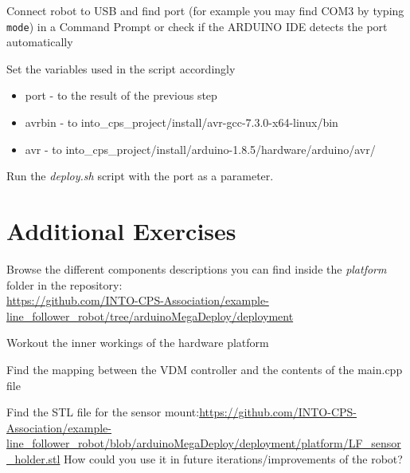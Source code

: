 \documentclass[11pt,a4paper]{../tutorial}
\begin{document}
\begin{instructions} 
\item Connect robot to USB and find port (for example you may find COM3 by typing \verb'mode') in a Command Prompt or check if the ARDUINO IDE detects the port automatically 

\item Set the variables used in the script accordingly
	\begin{itemize}
		\item port - to the result of the previous step
		\item avrbin - to into\_cps\_project/install/avr-gcc-7.3.0-x64-linux/bin 
		\item avr - to into\_cps\_project/install/arduino-1.8.5/hardware/arduino/avr/ 
	\end{itemize}

\item Run the \emph{deploy.sh} script with the port as a parameter. 

\end{instructions}

\section{Additional Exercises}

\begin{instructions} 

\item Browse the different components descriptions you can find inside the \emph{platform} folder in the repository:\\
\url{https://github.com/INTO-CPS-Association/example-line\_follower\_robot/tree/arduinoMegaDeploy/deployment}
\item Workout the inner workings of the hardware platform
\item Find the mapping between the VDM controller and the contents of the main.cpp file 

\item Find the STL file for the sensor mount:\url{https://github.com/INTO-CPS-Association/example-line_follower_robot/blob/arduinoMegaDeploy/deployment/platform/LF_sensor_holder.stl} How could you use it in future iterations/improvements of the robot? 
\end{instructions}
\end{document}
